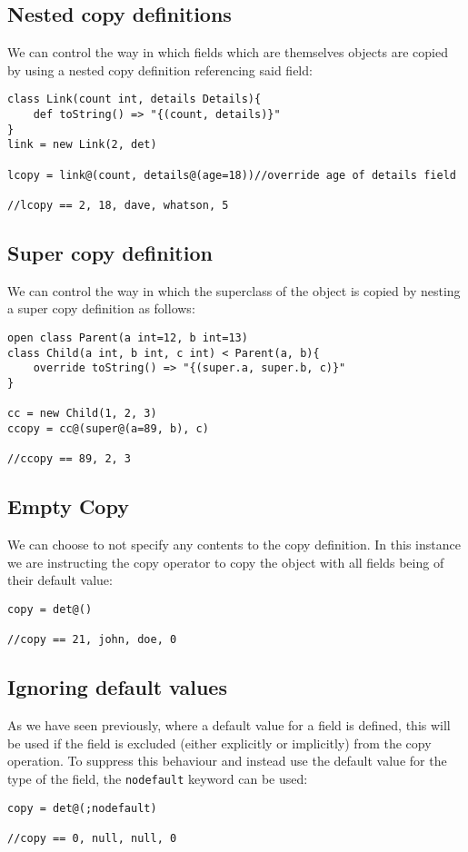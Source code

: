 \documentclass[conc-doc]{subfiles}
\begin{document}
\subsection{Nested copy definitions}
We can control the way in which fields which are themselves objects are copied by using a nested copy definition referencing said field:
\begin{lstlisting}
class Link(count int, details Details){
	def toString() => "{(count, details)}"
}
link = new Link(2, det)

lcopy = link@(count, details@(age=18))//override age of details field

//lcopy == 2, 18, dave, whatson, 5
\end{lstlisting}

\subsection{Super copy definition}
We can control the way in which the superclass of the object is copied by nesting a super copy definition as follows:
\begin{lstlisting}
open class Parent(a int=12, b int=13)
class Child(a int, b int, c int) < Parent(a, b){
	override toString() => "{(super.a, super.b, c)}"
}

cc = new Child(1, 2, 3)
ccopy = cc@(super@(a=89, b), c)

//ccopy == 89, 2, 3
\end{lstlisting}

\subsection{Empty Copy}
We can choose to not specify any contents to the copy definition. In this instance we are instructing the copy operator to copy the object with all fields being of their default value:
\begin{lstlisting}
copy = det@()

//copy == 21, john, doe, 0
\end{lstlisting}

\subsection{Ignoring default values}
As we have seen previously, where a default value for a field is defined, this will be used if the field is excluded (either explicitly or implicitly) from the copy operation. To suppress this behaviour and instead use the default value for the type of the field, the \lstinline{nodefault} keyword can be used:
\begin{lstlisting}
copy = det@(;nodefault)

//copy == 0, null, null, 0
\end{lstlisting}
\end{document}

